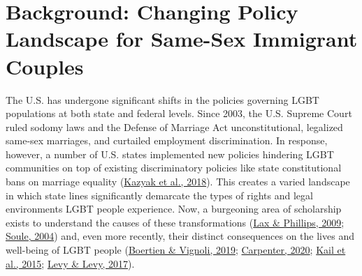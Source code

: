 \documentclass[
  11pt,
]{article}
\begin{document}
\hypertarget{background-changing-policy-landscape-for-same-sex-immigrant-couples}{%
\section{Background: Changing Policy Landscape for Same-Sex Immigrant Couples}\label{background-changing-policy-landscape-for-same-sex-immigrant-couples}}

The U.S. has undergone significant shifts in the policies governing LGBT populations at both state and federal levels. Since 2003, the U.S. Supreme Court ruled sodomy laws and the Defense of Marriage Act unconstitutional, legalized same-sex marriages, and curtailed employment discrimination. In response, however, a number of U.S. states implemented new policies hindering LGBT communities on top of existing discriminatory policies like state constitutional bans on marriage equality (\protect\hyperlink{ref-kazyak_2018}{Kazyak et al., 2018}). This creates a varied landscape in which state lines significantly demarcate the types of rights and legal environments LGBT people experience. Now, a burgeoning area of scholarship exists to understand the causes of these transformations (\protect\hyperlink{ref-lax_2009}{Lax \& Phillips, 2009}; \protect\hyperlink{ref-soule_2004}{Soule, 2004}) and, even more recently, their distinct consequences on the lives and well-being of LGBT people (\protect\hyperlink{ref-boertien_2019}{Boertien \& Vignoli, 2019}; \protect\hyperlink{ref-carpenter_2020}{Carpenter, 2020}; \protect\hyperlink{ref-kail_2015}{Kail et al., 2015}; \protect\hyperlink{ref-levy_2017}{Levy \& Levy, 2017}).
\end{document}
